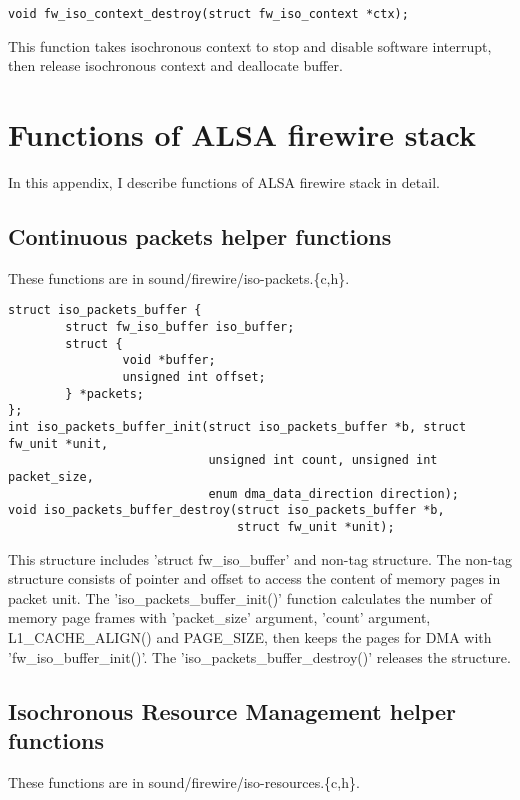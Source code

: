 \documentclass[onecolumn]{jarticle}
\begin{document}
\begin{verbatim}
void fw_iso_context_destroy(struct fw_iso_context *ctx);
\end{verbatim}

This function takes isochronous context to stop and disable software interrupt, then release isochronous context and deallocate buffer.

\newpage

\section{Functions of ALSA firewire stack}

In this appendix, I describe functions of ALSA firewire stack in detail.

\subsection{Continuous packets helper functions}

These functions are in sound/firewire/iso-packets.\{c,h\}.

\begin{verbatim}
struct iso_packets_buffer {
        struct fw_iso_buffer iso_buffer;
        struct {
                void *buffer;
                unsigned int offset;
        } *packets;
};
int iso_packets_buffer_init(struct iso_packets_buffer *b, struct fw_unit *unit,
                            unsigned int count, unsigned int packet_size,
                            enum dma_data_direction direction);
void iso_packets_buffer_destroy(struct iso_packets_buffer *b,
                                struct fw_unit *unit);
\end{verbatim}

This structure includes 'struct fw\_iso\_buffer' and non-tag structure. The non-tag structure consists of pointer and offset to access the content of memory pages in packet unit. The 'iso\_packets\_buffer\_init()' function calculates the number of memory page frames with 'packet\_size' argument, 'count' argument, L1\_CACHE\_ALIGN() and PAGE\_SIZE, then keeps the pages for DMA with 'fw\_iso\_buffer\_init()'. The 'iso\_packets\_buffer\_destroy()' releases the structure.

\subsection{Isochronous Resource Management helper functions}

These functions are in sound/firewire/iso-resources.\{c,h\}.
\end{document}

